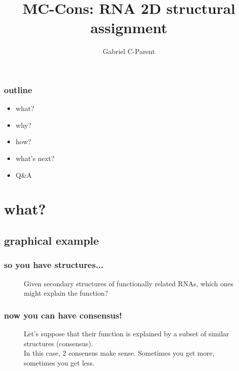 \documentclass{beamer}
\title{MC-Cons: RNA 2D structural assignment}
\author{Gabriel C-Parent}
\begin{document}
\maketitle


\begin{frame}
	\frametitle{outline}
	\begin{center}
		\begin{itemize}
			\item what?
			\item why?
			\item how?
			\item what's next?
			\item Q\&A
		\end{itemize}
	\end{center}
\end{frame}



\section{what?}

\subsection{graphical example}

\begin{frame}
	\frametitle{so you have structures...}
\begin{figure}[!htb]
\centering
\resizebox{0.5\textwidth}{!}{}
\caption{Given secondary structures of functionally related RNAs, which ones might explain the function?}
\end{figure} 
\end{frame}



\begin{frame}
	\frametitle{now you can have consensus!}
	\begin{figure}[!htb]
	\centering
	\resizebox{0.75\textwidth}{!}{}
	\caption{Let's suppose that their function is explained by a subset of similar structures (consensus). \\\hspace{\textwidth}In this case, 2 consensus make sense. Sometimes you get more, sometimes you get less.}
	\end{figure} 
\end{frame}
\end{document}
